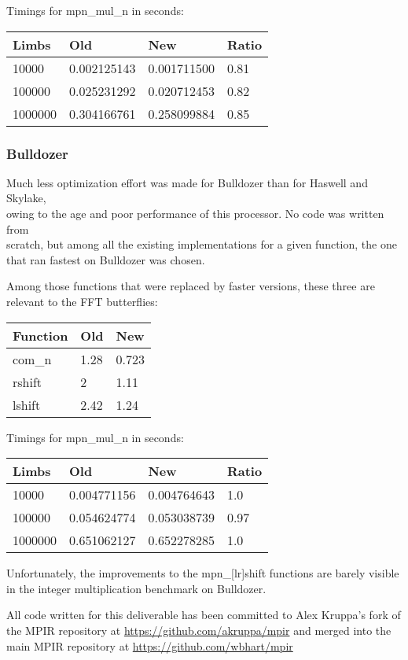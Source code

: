 Timings for mpn\_mul\_n in seconds:

\begin{longtable}[c]{@{}llll@{}}
\toprule
Limbs & Old & New & Ratio\tabularnewline
\midrule
\endhead
10000 & 0.002125143 & 0.001711500 & 0.81\tabularnewline
100000 & 0.025231292 & 0.020712453 & 0.82\tabularnewline
1000000 & 0.304166761 & 0.258099884 & 0.85\tabularnewline
\bottomrule
\end{longtable}

\subsubsection{Bulldozer}\label{bulldozer}

Much less optimization effort was made for Bulldozer than for Haswell
and Skylake,\\
owing to the age and poor performance of this processor. No code was
written from\\
scratch, but among all the existing implementations for a given
function, the one\\
that ran fastest on Bulldozer was chosen.

Among those functions that were replaced by faster versions, these three
are\\
relevant to the FFT butterflies:

\begin{longtable}[c]{@{}lll@{}}
\toprule
Function & Old & New\tabularnewline
\midrule
\endhead
com\_n & 1.28 & 0.723\tabularnewline
rshift & 2 & 1.11\tabularnewline
lshift & 2.42 & 1.24\tabularnewline
\bottomrule
\end{longtable}

Timings for mpn\_mul\_n in seconds:

\begin{longtable}[c]{@{}llll@{}}
\toprule
Limbs & Old & New & Ratio\tabularnewline
\midrule
\endhead
10000 & 0.004771156 & 0.004764643 & 1.0\tabularnewline
100000 & 0.054624774 & 0.053038739 & 0.97\tabularnewline
1000000 & 0.651062127 & 0.652278285 & 1.0\tabularnewline
\bottomrule
\end{longtable}

Unfortunately, the improvements to the mpn\_{[}lr{]}shift functions are
barely visible\\
in the integer multiplication benchmark on Bulldozer.

All code written for this deliverable has been committed to Alex
Kruppa's fork of the MPIR repository at
\url{https://github.com/akruppa/mpir} and merged into the main MPIR
repository at \url{https://github.com/wbhart/mpir}
